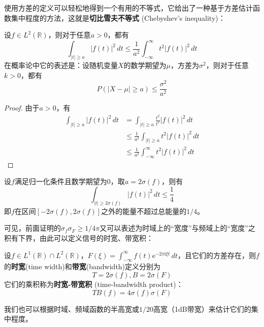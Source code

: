 使用方差的定义可以轻松地得到一个有用的不等式，它给出了一种基于方差估计函数集中程度的方法，这就是\textbf{切比雪夫不等式} (Chebyshev's inequality)：
\begin{theorem}[切比雪夫不等式]
    设$f\in L^2(\mathbb{R} )$，则对于任意$a>0$，都有
    \[\int_{|t|\geq a}|f(t)|^2\,dt\leq \frac{1}{a^2}\int_{-\infty}^{\infty}t^2|f(t)|^2\,dt\]
    在概率论中它的表述是：设随机变量$X$的数学期望为$\mu$，方差为$\sigma^2$，则对于任意$k>0$，都有\[P(|X-\mu|\geq a)\leq \frac{\sigma^2}{a^2}\]
\end{theorem}
\begin{proof}
    由于$a>0$，有
    \begin{align*}
    \int_{|t|\geq a}|f(t)|^2\,dt&=\int_{|t|\geq a}\frac{t^2}{t^2}|f(t)|^2\,dt\\
    &\leq \frac{1}{a^2}\int_{|t|\geq a}t^2|f(t)|^2\,dt\\
    &\leq \frac{1}{a^2}\int_{-\infty}^{\infty}t^2|f(t)|^2\,dt
\end{align*}
\end{proof}

\begin{example}
    设$f$满足归一化条件且数学期望为0，取$a=2\sigma(f)$，则有\[\int_{|t|\geq 2\sigma(f)}|f(t)|^2\,dt\leq \frac{1}{4}\]
即$f$在区间$[-2\sigma(f),2\sigma(f)]$之外的能量不超过总能量的$1/4$。
\end{example}
可见，前面证明的$\sigma_f \sigma_F\geq 1/4\pi$又可以表述为时域上的“宽度”与频域上的“宽度”之积有下界，由此可以定义信号的时宽、带宽积：
\begin{definition}[时宽-带宽积]
    设$f\in L^1(\mathbb{R} )\cap L^2(\mathbb{R} )$，$F(\xi)=\int_{-\infty}^{\infty}f(t)\mathrm{e}^{-2\pi \mathrm{i}\xi t}\,dt$，且它们的方差存在，则$f$的\textbf{时宽}(time width)和\textbf{带宽}(bandwidth)定义分别为
    \[T=2\sigma(f),B=2\sigma(F)\]
    它们的乘积称为\textbf{时宽-带宽积} (time-bandwidth product)：
    \[TB(f)=4\sigma(f)\sigma(F)\]
\end{definition}

我们也可以根据时域、频域函数的半高宽或$1/20$高宽（1dB带宽）来估计它们的集中程度。

